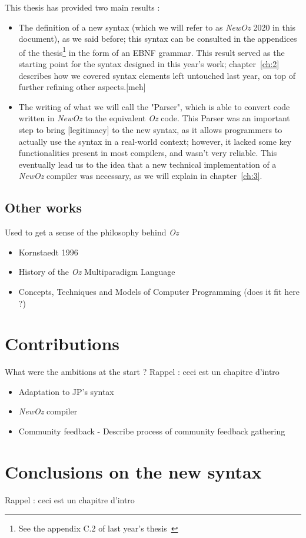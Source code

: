 This thesis has provided two main results :
\begin{itemize}
    \item The definition of a new syntax (which we will refer to as \textit{NewOz} 2020 in this document), as we said before;
    this syntax can be consulted in the appendices of the thesis\footnote{See the appendix C.2 of last year's thesis~\cite{jpthesis}} in the form of an EBNF grammar.
    This result served as the starting point for the syntax designed in this year's work;
    chapter~\ref{ch:2} describes how we covered syntax elements left untouched last year, on top of further refining other aspects.[meh]
    \item The writing of what we will call the "Parser", which is able to convert code written in \textit{NewOz} to the equivalent \textit{Oz} code.
    This Parser was an important step to bring [legitimacy] to the new syntax, as it allows programmers to actually use the syntax in a real-world context;
    however, it lacked some key functionalities present in most compilers, and wasn't very reliable.
    This eventually lead us to the idea that a new technical implementation of a \textit{NewOz} compiler was necessary, as we will explain in chapter~\ref{ch:3}.
\end{itemize}

\subsection{Other works}\label{subsec:ch1-others}
Used to get a sense of the philosophy behind \textit{Oz}
\begin{itemize}
    \item Kornstaedt 1996
    \item History of the \textit{Oz} Multiparadigm Language
    \item Concepts, Techniques and Models of Computer Programming (does it fit here ?)
\end{itemize}

\section{Contributions}\label{sec:ch1-3}

What were the ambitions at the start ?
Rappel : ceci est un chapitre d'intro
\begin{itemize}
    \item Adaptation to JP's syntax
    \item \textit{NewOz} compiler
    \item Community feedback -
    Describe process of community feedback gathering
\end{itemize}

\section{Conclusions on the new syntax}\label{sec:ch1-4}
Rappel : ceci est un chapitre d'intro